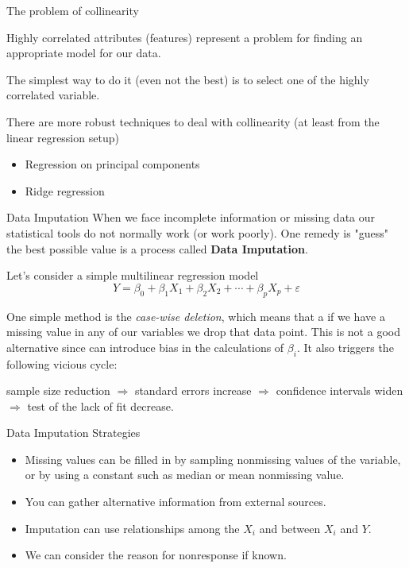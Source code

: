 \documentclass{beamer}
\begin{document}
\begin{frame}{The problem of collinearity}
	
	Highly correlated attributes (features) represent a problem for finding an appropriate model for our data.
	
	The simplest way to do it (even not the best) is to select one of the highly correlated variable. 
	
	There are more robust techniques to deal with collinearity (at least from the linear regression setup)
	\begin{itemize}
		\item Regression on principal components
		\item Ridge regression 
	\end{itemize}

\end{frame}

\begin{frame}{Data Imputation}
	When we face incomplete information or missing data our statistical tools do not normally work (or work poorly). One remedy is  "guess" the best possible value is a process called {\bf Data Imputation}.
	
	Let's consider a simple multilinear regression model 
	\begin{equation*}
		Y= \beta_0 + \beta_1 X_1 + \beta_2 X_2 + \cdots+ \beta_p X_p + \varepsilon 
	\end{equation*}
	
	One simple method is the {\it case-wise deletion}, which means that a if we have a missing value in any of our variables we drop that data point. This is not a good alternative since can introduce bias in the calculations of $\beta_i$. It also triggers the following vicious cycle:
	
	sample size reduction $\Rightarrow$ standard errors increase $\Rightarrow$ confidence intervals widen $\Rightarrow$ test of the lack of fit decrease. 
	
\end{frame}

\begin{frame}{Data Imputation Strategies}
	\begin{itemize}
		\item Missing values can be filled in by sampling nonmissing values of the variable, or by using a constant such as median or mean nonmissing value.
		\item You can gather alternative information from external sources.
		\item Imputation can use relationships among the $X_i$ and between $X_i$ and $Y$.
		\item We can consider the reason for nonresponse if known.
		
	\end{itemize}
\end{frame}
\end{document}
